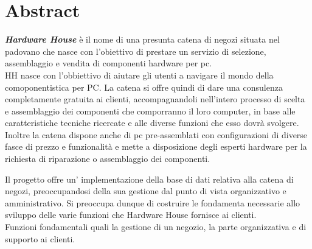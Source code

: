\section{Abstract}

 \textbf{\textit{Hardware House}} è il nome di una presunta catena di negozi situata nel padovano che nasce con l'obiettivo di prestare un servizio di selezione, assemblaggio e vendita di componenti hardware per pc.\\
HH nasce con l'obbiettivo di aiutare gli utenti a navigare il mondo della comoponentistica
per PC. La catena si offre quindi di dare una consulenza completamente gratuita ai clienti, accompagnandoli nell'intero processo di scelta e assemblaggio dei componenti che comporranno il loro computer, in base alle caratteristiche tecniche ricercate e alle diverse funzioni che esso dovrà svolgere.\\
Inoltre la catena dispone anche di pc pre-assemblati con configurazioni di diverse fasce di prezzo e funzionalità e mette a disposizione degli esperti hardware per la richiesta di riparazione o assemblaggio dei componenti.\par
Il progetto offre un' implementazione della base di dati relativa alla catena di negozi, preoccupandosi della sua gestione dal punto di vista organizzativo e amministrativo. Si preoccupa dunque di costruire le fondamenta necessarie allo sviluppo delle varie funzioni che Hardware House fornisce ai clienti.\\
Funzioni fondamentali quali la gestione di un negozio, la parte organizzativa e di supporto ai clienti.
